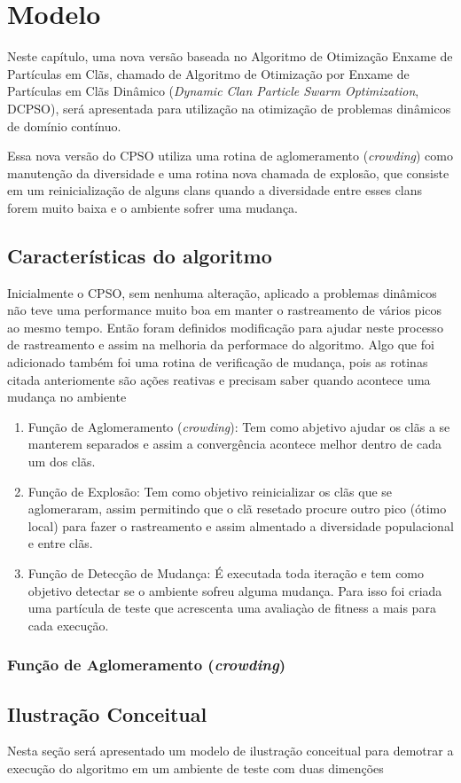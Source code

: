 \chapter{Modelo}
\label{ch:modelo}

Neste capítulo, uma nova versão baseada no Algoritmo de Otimização Enxame de Partículas em Clãs, chamado de Algoritmo de Otimização por Enxame de Partículas em Clãs Dinâmico (\textit{Dynamic Clan Particle Swarm Optimization}, DCPSO), será apresentada para utilização na otimização de problemas dinâmicos de domínio contínuo.

Essa nova versão do CPSO utiliza uma rotina de aglomeramento (\textit{crowding}) como manutenção da diversidade e uma rotina nova chamada de explosão, que consiste em um reinicialização de alguns clans quando a diversidade entre esses clans forem muito baixa e o ambiente sofrer uma mudança.

\section{Características do algoritmo}
\label{sec:caracteristicas_algoritmo}

Inicialmente o CPSO, sem nenhuma alteração, aplicado a problemas dinâmicos não teve uma performance muito boa em manter o rastreamento de vários picos ao mesmo tempo. Então foram definidos modificação para ajudar neste processo de rastreamento e assim na melhoria da performace do algoritmo. Algo que foi adicionado também foi uma rotina de verificação de mudança, pois as rotinas citada anteriomente são ações reativas e precisam saber quando acontece uma mudança no ambiente

\begin{enumerate}
	\item Função de Aglomeramento (\textit{crowding}): Tem como abjetivo ajudar os clãs a se manterem separados e assim a convergência acontece melhor dentro de cada um dos clãs.
	\item Função de Explosão: Tem como objetivo reinicializar os clãs que se aglomeraram, assim permitindo que o clã resetado procure outro pico (ótimo local) para fazer o rastreamento e assim almentado a diversidade populacional e entre clãs.
	\item Função de Detecção de Mudança: É executada toda iteração e tem como objetivo detectar se o ambiente sofreu alguma mudança. Para isso foi criada uma partícula de teste que acrescenta uma avaliaçào de fitness a mais para cada execução.
\end{enumerate}

\subsection{Função de Aglomeramento (\textit{crowding})}
\label{subsec:crowding}


\section{Ilustração Conceitual}
\label{sec:ilustracao_conceitual}

Nesta seção será apresentado um modelo de ilustração conceitual para demotrar a execução do algoritmo em um ambiente de teste com duas dimenções
